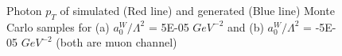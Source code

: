 \begin{figure}[]
  \begin{center}
    \caption{Photon $p_{T}$ of simulated (Red line) and generated (Blue line) Monte Carlo samples for (a) $a_{0}^{W}/\Lambda^{2}$ = 5E-05 $GeV^{-2}$ and (b) $a_{0}^{W}/\Lambda^{2}$ = -5E-05 $GeV^{-2}$ (both are muon channel)}
  \label{fig:para_closure}
  \end{center}
\end{figure}

